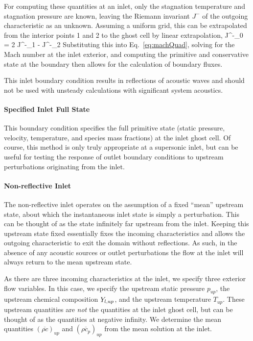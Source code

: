 For computing these quantities at an inlet, only the stagnation temperature and stagnation pressure are known, leaving the Riemann invariant $J^-$ of the outgoing characteristic as an unknown. Assuming a uniform grid, this can be extrapolated from the interior points 1 and 2 to the ghost cell by linear extrapolation,
\be
	J^-_0 = 2 J^-_1 - J^-_2
\ee
Substituting this into Eq.~\ref{eq:machQuad}, solving for the Mach number at the inlet exterior, and computing the primitive and conservative state at the boundary then allows for the calculation of boundary fluxes.

This inlet boundary condition results in reflections of acoustic waves and should not be used with unsteady calculations with significant system acoustics.


\paragraph{Specified Inlet Full State}

This boundary condition specifies the full primitive state (static pressure, velocity, temperature, and species mass fractions) at the inlet ghost cell. Of course, this method is only truly appropriate at a supersonic inlet, but can be useful for testing the response of outlet boundary conditions to upstream perturbations originating from the inlet.

\paragraph{Non-reflective Inlet}

The non-reflective inlet operates on the assumption of a fixed ``mean'' upstream state, about which the instantaneous inlet state is simply a perturbation. This can be thought of as the state infinitely far upstream from the inlet. Keeping this upstream state fixed essentially fixes the incoming characteristics and allows the outgoing characteristic to exit the domain without reflections. As such, in the absence of any acoustic sources or outlet perturbations the flow at the inlet will always return to the mean upstream state. 

As there are three incoming characteristics at the inlet, we specify three exterior flow variables. In this case, we specify the upstream static pressure $p_{up}$, the upstream chemical composition $Y_{l,up}$, and the upstream temperature $T_{up}$. These upstream quantities are \textit{not} the quantities at the inlet ghost cell, but can be thought of as the quantities at negative infinity. We determine the mean quantities $(\overline{\rho c})_{up}$ and $(\overline{\rho c_p})_{up}$ from the mean solution at the inlet. 

